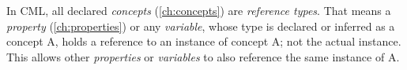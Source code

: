 In CML, all declared \emph{concepts} (\ref{ch:concepts}) are \emph{reference types}.
That means a \emph{property} (\ref{ch:properties}) or any \emph{variable},
whose type is declared or inferred as a concept A, holds a reference
to an instance of concept A; not the actual instance.
This allows other \emph{properties} or \emph{variables}
to also reference the same instance of A.
